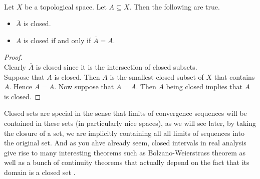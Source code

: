 \documentclass[a4paper]{article}
\begin{document}
\begin{lmm}{}{}\\
Let $X$ be a topological space. Let $A\subseteq X$. Then the following are true. 
\begin{itemize}
\item $\overline{A}$ is closed. 
\item $A$ is closed if and only if $\overline{A}=A$. 
\end{itemize}
\begin{proof}\\
Clearly $\overline{A}$ is closed since it is the intersection of closed subsets. \\

Suppose that $A$ is closed. Then $A$ is the smallest closed subset of $X$ that contains $A$. Hence $\overline{A}=A$. Now suppose that $\overline{A}=A$. Then $\overline{A}$ being closed implies that $A$ is closed. 
\end{proof}
\end{lmm}

Closed sets are special in the sense that limits of convergence sequences will be contained in these sets (in particularly nice spaces), as we will see later, by taking the closure of a set, we are implicitly containing all all limits of sequences into the original set. And as you ahve already seem, closed intervals in real analysis give rise to many interesting theorems such as Bolzano-Weierstrass theorem as well as a bunch of continuity theorems that actually depend on the fact that its domain is a closed set . 
\end{document}
